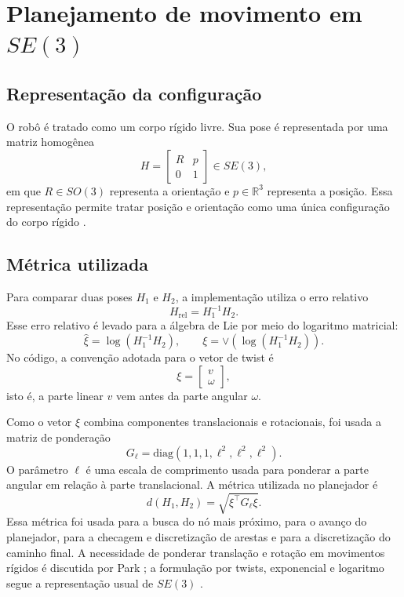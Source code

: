 \documentclass[12pt,a4paper]{article}
\begin{document}
\section{Planejamento de movimento em \texorpdfstring{$SE(3)$}{SE(3)}}

\subsection{Representação da configuração}

O robô é tratado como um corpo rígido livre. Sua pose é representada por uma
matriz homogênea
\[
H =
\begin{bmatrix}
R & p \\
0 & 1
\end{bmatrix}
\in SE(3),
\]
em que \(R \in SO(3)\) representa a orientação e
\(p \in \mathbb{R}^3\) representa a posição. Essa representação permite tratar
posição e orientação como uma única configuração do corpo rígido
\cite{LynchPark2017,Murray1994,Barfoot2017}.

\subsection{Métrica utilizada}

Para comparar duas poses \(H_1\) e \(H_2\), a implementação utiliza o erro
relativo
\[
H_{\mathrm{rel}} = H_1^{-1}H_2.
\]
Esse erro relativo é levado para a álgebra de Lie por meio do logaritmo
matricial:
\[
\hat{\xi}
=
\log(H_1^{-1}H_2),
\qquad
\xi
=
\vee\left(\log(H_1^{-1}H_2)\right).
\]
No código, a convenção adotada para o vetor de twist é
\[
\xi =
\begin{bmatrix}
v \\
\omega
\end{bmatrix},
\]
isto é, a parte linear \(v\) vem antes da parte angular \(\omega\).

Como o vetor \(\xi\) combina componentes translacionais e rotacionais, foi usada
a matriz de ponderação
\[
G_\ell =
\mathrm{diag}(1,1,1,\ell^2,\ell^2,\ell^2).
\]
O parâmetro \(\ell\) é uma escala de comprimento usada para ponderar a parte
angular em relação à parte translacional. A métrica utilizada no planejador é
\[
d(H_1,H_2)
=
\sqrt{
\xi^\top G_\ell \xi
}.
\]
Essa métrica foi usada para a busca do nó mais próximo, para o avanço do
planejador, para a checagem e discretização de arestas e para a discretização do
caminho final. A necessidade de ponderar translação e rotação em movimentos
rígidos é discutida por Park \cite{Park1995}; a formulação por twists,
exponencial e logaritmo segue a representação usual de \(SE(3)\)
\cite{LynchPark2017,Barfoot2017}.
\end{document}
